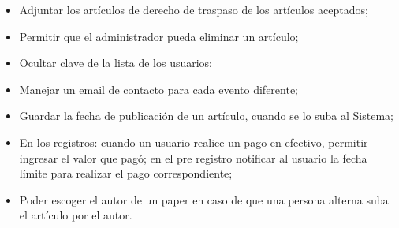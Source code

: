 \begin{indentar}
\begin{itemize}
\begin{itemize}
	\item Adjuntar los art\'iculos de derecho de traspaso de los art\'iculos aceptados;
	\item Permitir que el administrador pueda eliminar un art\'iculo;
	\item Ocultar clave de la lista de los usuarios;
	\item Manejar un email de contacto para cada evento diferente;
	\item Guardar la fecha de publicaci\'on de un art\'iculo, cuando se lo suba al Sistema;
	\item En los registros: cuando un usuario realice un pago en efectivo, permitir ingresar el valor que pag\'o; en el pre registro notificar al usuario la fecha l\'imite para realizar el pago correspondiente;
	\item Poder escoger el autor de un paper en caso de que una persona alterna suba el art\'iculo por el autor.
	\end{itemize}
\end{itemize}
\end{indentar}

